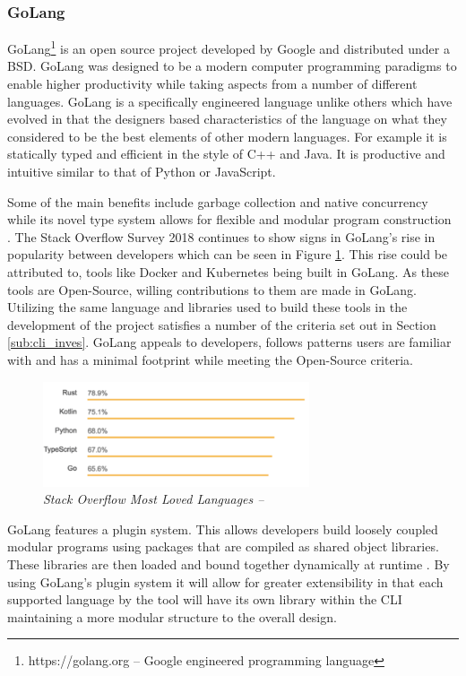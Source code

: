 \subsubsection{GoLang}
\label{sub:golang}
\gls{GoLang}\footnote{https://golang.org -- Google engineered programming language} is an open source project developed by Google and distributed under a \gls{BSD}. \gls{GoLang} was designed to be a modern computer programming paradigms to enable higher productivity while taking aspects from a number of different languages. \gls{GoLang} is a specifically engineered language unlike others which have evolved in that the designers based characteristics of the language on what they considered to be the best elements of other modern languages. For example it is statically typed and efficient in the style of C++ and Java. It is productive and intuitive similar to that of Python or JavaScript. 

Some of the main benefits include garbage collection and native concurrency while its novel type system allows for flexible and modular program construction \citep{golang}. The Stack Overflow Survey 2018 \citep{overflow_2018} continues to show signs in \gls{GoLang}'s rise in popularity between developers which can be seen in Figure \ref{img:surv_2018}. This rise could be attributed to, tools like \gls{Docker} and \gls{Kubernetes} being built in \gls{GoLang}. As these tools are \gls{Open-Source}, willing contributions to them are made in \gls{GoLang}. Utilizing the same language and libraries used to build these tools in the development of the project satisfies a number of the criteria set out in Section \ref{sub:cli_inves}. \gls{GoLang} appeals to developers, follows patterns users are familiar with and has a minimal footprint while meeting the \gls{Open-Source} criteria.

\begin{figure}[!ht]
\centering
\includegraphics*[width=0.7\textwidth]{images/a2.png}
\caption{\em Stack Overflow Most Loved Languages -- \cite{overflow_2018}}
\label{img:surv_2018}
\end{figure}

\gls{GoLang} features a plugin system. This allows developers build loosely coupled modular programs using packages that are compiled as shared object libraries. These libraries are then loaded and bound together dynamically at runtime \citep{vivien_2017}. By using \gls{GoLang}'s plugin system it will allow for greater extensibility in that each supported language by the tool will have its own library within the \gls{CLI} maintaining a more modular structure to the overall design.

